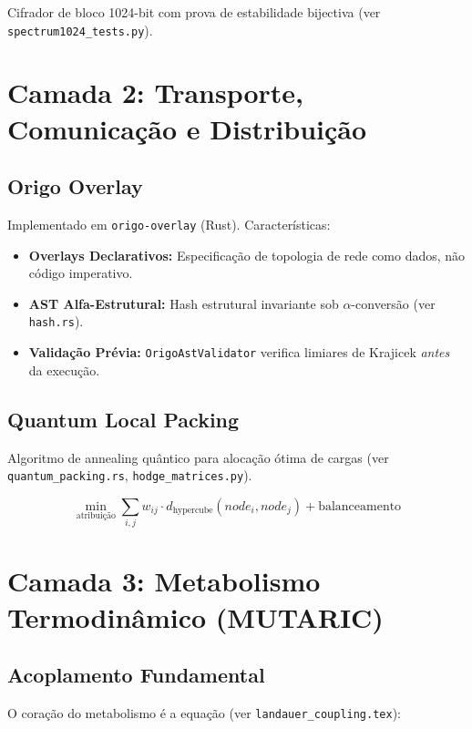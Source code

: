 \documentclass[11pt,a4paper]{article}
\begin{document}
Cifrador de bloco 1024-bit com prova de estabilidade bijectiva (ver \texttt{spectrum1024\_tests.py}).

\section{Camada 2: Transporte, Comunicação e Distribuição}

\subsection{Origo Overlay}

Implementado em \texttt{origo-overlay} (Rust). Características:

\begin{itemize}
    \item \textbf{Overlays Declarativos:} Especificação de topologia de rede como dados, não código imperativo.
    \item \textbf{AST Alfa-Estrutural:} Hash estrutural invariante sob $\alpha$-conversão (ver \texttt{hash.rs}).
    \item \textbf{Validação Prévia:} \texttt{OrigoAstValidator} verifica limiares de Krajicek \textit{antes} da execução.
\end{itemize}

\subsection{Quantum Local Packing}

Algoritmo de annealing quântico para alocação ótima de cargas (ver \texttt{quantum\_packing.rs}, \texttt{hodge\_matrices.py}).

\begin{equation}
    \min_{\text{atribuição}} \sum_{i,j} w_{ij} \cdot d_{\text{hypercube}}(node_i, node_j) + \text{balanceamento}
\end{equation}

\section{Camada 3: Metabolismo Termodinâmico (MUTARIC)}

\subsection{Acoplamento Fundamental}

O coração do metabolismo é a equação (ver \texttt{landauer\_coupling.tex}):
\end{document}
